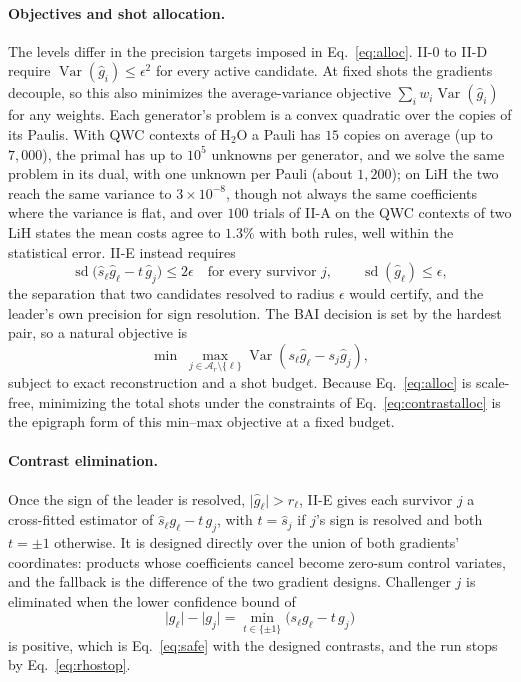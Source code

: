 \documentclass[aps,pra,reprint,superscriptaddress,nofootinbib]{revtex4-2}
\begin{document}
\paragraph{Objectives and shot allocation.} The levels differ in the precision targets imposed in Eq.~\eqref{eq:alloc}. II-0 to II-D require $\operatorname{Var}(\hat g_i)\le\epsilon^2$ for every active candidate. At fixed shots the gradients decouple, so this also minimizes the average-variance objective $\sum_iw_i\operatorname{Var}(\hat g_i)$ for any weights. Each generator's problem is a convex quadratic over the copies of its Paulis. With QWC contexts of H$_2$O a Pauli has $15$ copies on average (up to $7{,}000$), the primal has up to $10^5$ unknowns per generator, and we solve the same problem in its dual, with one unknown per Pauli (about $1{,}200$); on LiH the two reach the same variance to $3\times10^{-8}$, though not always the same coefficients where the variance is flat, and over $100$ trials of II-A on the QWC contexts of two LiH states the mean costs agree to $1.3\%$ with both rules, well within the statistical error. II-E instead requires
\begin{equation}
\operatorname{sd}\big(\hat s_\ell\hat g_\ell-t\,\hat g_j\big)\le2\epsilon\quad\text{for every survivor } j,\qquad \operatorname{sd}(\hat g_\ell)\le\epsilon ,
\label{eq:contrastalloc}
\end{equation}
the separation that two candidates resolved to radius $\epsilon$ would certify, and the leader's own precision for sign resolution. The BAI decision is set by the hardest pair, so a natural objective is
\begin{equation}
\min\;\max_{j\in\mathcal A_r\setminus\{\ell\}}\operatorname{Var}(s_\ell\hat g_\ell-s_j\hat g_j),
\end{equation}
subject to exact reconstruction and a shot budget. Because Eq.~\eqref{eq:alloc} is scale-free, minimizing the total shots under the constraints of Eq.~\eqref{eq:contrastalloc} is the epigraph form of this min--max objective at a fixed budget. 

\paragraph{Contrast elimination.} Once the sign of the leader is resolved, $\lvert\hat g_\ell\rvert>r_\ell$, II-E gives each survivor $j$ a cross-fitted estimator of $\hat s_\ell g_\ell-t\,g_j$, with $t=\hat s_j$ if $j$'s sign is resolved and both $t=\pm1$ otherwise. It is designed directly over the union of both gradients' coordinates: products whose coefficients cancel become zero-sum control variates, and the fallback is the difference of the two gradient designs. Challenger $j$ is eliminated when the lower confidence bound of
\begin{equation}
\lvert g_\ell\rvert-\lvert g_j\rvert=\min_{t\in\{\pm1\}}\big(s_\ell g_\ell-t\,g_j\big)
\end{equation}
is positive, which is Eq.~\eqref{eq:safe} with the designed contrasts, and the run stops by Eq.~\eqref{eq:rhostop}.
\end{document}

